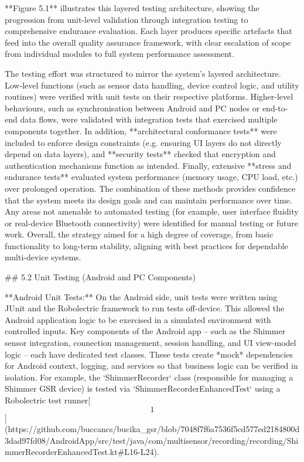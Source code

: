\documentclass[12pt,a4paper]{article}
\begin{document}
{**Figure 5.1** illustrates this layered testing architecture, showing the progression from unit-level validation through integration testing to comprehensive endurance evaluation. Each layer produces specific artefacts that feed into the overall quality assurance framework, with clear escalation of scope from individual modules to full system performance assessment.

The testing effort was structured to mirror the system's layered
architecture. Low-level functions (such as sensor data handling, device
control logic, and utility routines) were verified with unit tests on
their respective platforms. Higher-level behaviours, such as
synchronisation between Android and PC nodes or end-to-end data flows,
were validated with integration tests that exercised multiple components
together. In addition, **architectural conformance tests** were included
to enforce design constraints (e.g. ensuring UI layers do not directly
depend on data layers), and **security tests** checked that encryption
and authentication mechanisms function as intended. Finally, extensive
**stress and endurance tests** evaluated system performance (memory
usage, CPU load, etc.) over prolonged operation. The combination of
these methods provides confidence that the system meets its design goals
and can maintain performance over time. Any areas not amenable to
automated testing (for example, user interface fluidity or real-device
Bluetooth connectivity) were identified for manual testing or future
work. Overall, the strategy aimed for a high degree of coverage, from
basic functionality to long-term stability, aligning with best practices
for dependable multi-device systems.

## 5.2 Unit Testing (Android and PC Components)

**Android Unit Tests:** On the Android side, unit tests were written
using JUnit and the Robolectric framework to run tests off-device. This
allowed the Android application logic to be exercised in a simulated
environment with controlled inputs. Key components of the Android app --
such as the Shimmer sensor integration, connection management, session
handling, and UI view-model logic -- each have dedicated test classes.
These tests create *mock* dependencies for Android context, logging, and
services so that business logic can be verified in isolation. For
example, the `ShimmerRecorder` class (responsible for managing a Shimmer
GSR device) is tested via `ShimmerRecorderEnhancedTest` using a
Robolectric test
runner[\[1\]](https://github.com/buccancs/bucika_gsr/blob/7048f7f6a7536f5cd577ed2184800d3dad97fd08/AndroidApp/src/test/java/com/multisensor/recording/recording/ShimmerRecorderEnhancedTest.kt#L16-L24).

}
\end{document}
